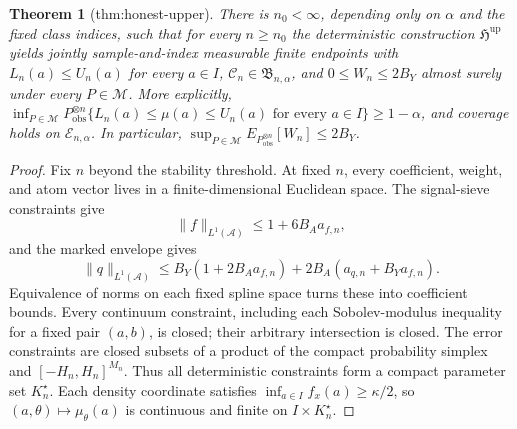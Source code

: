 \documentclass{article}
\newtheorem{theorem}{Theorem}
\begin{document}
\begin{theorem}[thm:honest-upper]\label{thm:honest-upper}
There is \(n_0<\infty\), depending only on \(\alpha\) and the fixed class indices, such that for every \(n\ge n_0\) the deterministic construction \(\mathfrak H^{\mathrm{up}}\) yields jointly sample-and-index measurable finite endpoints with \(L_n(a)\le U_n(a)\) for every \(a\in I\), \(\mathcal C_n\in\mathfrak B_{n,\alpha}\), and \(0\le W_n\le2B_Y\) almost surely under every \(P\in\mathcal M\). More explicitly, \(\inf_{P\in\mathcal M}P_{\mathrm{obs}}^{\otimes n}\{L_n(a)\le\mu(a)\le U_n(a)\text{ for every }a\in I\}\ge1-\alpha\), and coverage holds on \(\mathcal E_{n,\alpha}\). In particular, \(\sup_{P\in\mathcal M}E_{P_{\mathrm{obs}}^{\otimes n}}[W_n]\le2B_Y\).
\end{theorem}
\begin{proof}
Fix \(n\) beyond the stability threshold. At fixed \(n\), every coefficient, weight, and atom vector lives in a finite-dimensional Euclidean space. The signal-sieve constraints give
\[
 \|f\|_{L^1(\mathcal A)}\le1+6B_Aa_{f,n},
\]
and the marked envelope gives
\[
 \|q\|_{L^1(\mathcal A)}
 \le B_Y(1+2B_Aa_{f,n})+2B_A(a_{q,n}+B_Ya_{f,n}).
\]
Equivalence of norms on each fixed spline space turns these into coefficient bounds. Every continuum constraint, including each Sobolev-modulus inequality for a fixed pair \((a,b)\), is closed; their arbitrary intersection is closed. The error constraints are closed subsets of a product of the compact probability simplex and \([-H_n,H_n]^{M_n}\). Thus all deterministic constraints form a compact parameter set \(K_n^\star\). Each density coordinate satisfies \(\inf_{a\in I}f_x(a)\ge\kappa/2\), so \((a,\theta)\mapsto\mu_\theta(a)\) is continuous and finite on \(I\times K_n^\star\).


\end{proof}
\end{document}
